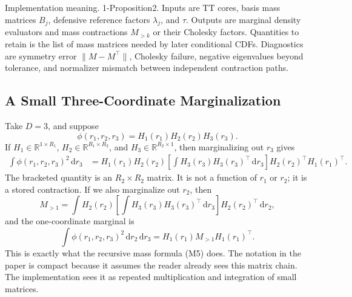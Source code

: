 \documentclass[11pt]{article}
\numberwithin{equation}{section}
\newcommand{\R}{\mathbb R}
\newcommand{\dd}{\,\mathrm d}
\begin{document}
Implementation meaning. 1-Proposition2.  Inputs are TT cores, basis mass
matrices \(B_j\), defensive reference factors \(\lambda_j\), and \(\tau\).
Outputs are marginal density evaluators and mass contractions \(M_{>k}\) or
their Cholesky factors.  Quantities to retain is the list of mass matrices needed by
later conditional CDFs.  Diagnostics are symmetry error
\(\|M-M^\top\|\), Cholesky failure, negative eigenvalues beyond tolerance, and
normalizer mismatch between independent contraction paths.

\begin{center}
\end{center}

\subsection{A Small Three-Coordinate Marginalization}

Take \(D=3\), and suppose
\[
    \phi(r_1,r_2,r_3)=H_1(r_1)H_2(r_2)H_3(r_3).
\]
If \(H_1\in\R^{1\times R_1}\),
\(H_2\in\R^{R_1\times R_2}\), and
\(H_3\in\R^{R_2\times 1}\), then marginalizing out \(r_3\) gives
\begin{equation}
\begin{aligned}
 \int \phi(r_1,r_2,r_3)^2\dd r_3
 &=
 H_1(r_1)H_2(r_2)
 \left[\int H_3(r_3)H_3(r_3)^\top\dd r_3\right]
 H_2(r_2)^\top H_1(r_1)^\top.
\end{aligned}
\label{eq:p24-m7}
\end{equation}
The bracketed quantity is an \(R_2\times R_2\) matrix.  It is not a function of
\(r_1\) or \(r_2\); it is a stored contraction.  If we also marginalize out
\(r_2\), then
\begin{equation}
    M_{>1}
    =
    \int
    H_2(r_2)
    \left[\int H_3(r_3)H_3(r_3)^\top\dd r_3\right]
    H_2(r_2)^\top
    \dd r_2,
    \label{eq:p24-m8}
\end{equation}
and the one-coordinate marginal is
\begin{equation}
    \int\phi(r_1,r_2,r_3)^2\dd r_2\dd r_3
    =
    H_1(r_1)M_{>1}H_1(r_1)^\top.
    \label{eq:p24-m9}
\end{equation}
This is exactly what the recursive mass formula (M5) does.  The notation in the
paper is compact because it assumes the reader already sees this matrix chain.
The implementation sees it as repeated multiplication and integration of small
matrices.
\end{document}
